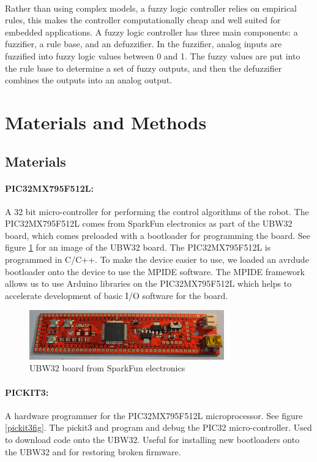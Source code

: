 \documentclass[letterpaper,12pt]{article}
\begin{document}
\paragraph{}Rather than using complex models, a fuzzy logic controller relies on
empirical rules, this makes the controller computationally cheap and well suited
for embedded applications. A fuzzy logic controller has three main components: a
fuzzifier, a rule base, and an defuzzifier. In the fuzzifier, analog inputs are
fuzzified into fuzzy logic values between 0 and 1. The fuzzy values are put into
the rule base to determine a set of fuzzy outputs, and then the defuzzifier
combines the outputs into an analog output\cite{Mailah2000}.


\section{Materials and Methods}
\subsection{Materials}
\paragraph{PIC32MX795F512L:}A 32 bit micro-controller for performing the control
algorithms of the robot. The PIC32MX795F512L comes from SparkFun electronics as
part of the UBW32 board, which comes preloaded with a bootloader for programming
the board. See figure \ref{ubw32fig} for an image of the UBW32 board. The
PIC32MX795F512L is programmed in C/C++. To make the device easier to use, we
loaded an avrdude bootloader onto the device to use the MPIDE software. The
MPIDE framework allows us to use Arduino libraries on the PIC32MX795F512L which
helps to accelerate development of basic I/O software for the
board\cite{pic32data}.

\begin{figure}
  \centering
    \includegraphics[width=0.75\textwidth]{figures/UBW32_v24_SparkFun.JPG}
  \caption{UBW32 board from SparkFun electronics}
  \label{ubw32fig}
\end{figure}

\paragraph{PICKIT3:}A hardware programmer for the PIC32MX795F512L
microprocessor. See figure \ref{pickit3fig}. The pickit3 and program and debug
the PIC32 micro-controller.  Used to download code onto the UBW32. Useful for
installing new bootloaders onto the UBW32 and for restoring broken
firmware\cite{pickitdata}.
\end{document}
